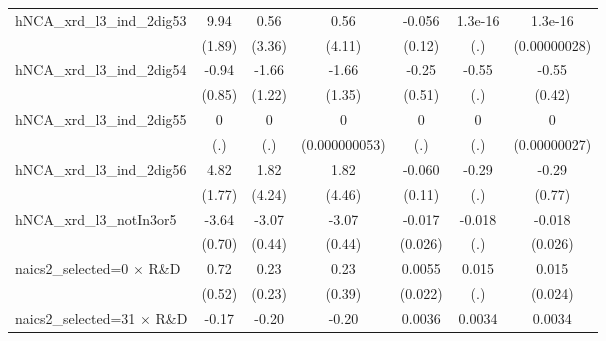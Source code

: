 {\begin{tabular}{l*{6}{c}}
hNCA\_xrd\_l3\_ind\_2dig53&        9.94\sym{***}&        0.56         &        0.56         &      -0.056         &     1.3e-16         &     1.3e-16         \\
                    &      (1.89)         &      (3.36)         &      (4.11)         &      (0.12)         &         (.)         &(0.00000028)         \\
\addlinespace
hNCA\_xrd\_l3\_ind\_2dig54&       -0.94         &       -1.66         &       -1.66         &       -0.25         &       -0.55         &       -0.55         \\
                    &      (0.85)         &      (1.22)         &      (1.35)         &      (0.51)         &         (.)         &      (0.42)         \\
\addlinespace
hNCA\_xrd\_l3\_ind\_2dig55&           0         &           0         &           0         &           0         &           0         &           0         \\
                    &         (.)         &         (.)         &(0.000000053)         &         (.)         &         (.)         &(0.00000027)         \\
\addlinespace
hNCA\_xrd\_l3\_ind\_2dig56&        4.82\sym{***}&        1.82         &        1.82         &      -0.060         &       -0.29         &       -0.29         \\
                    &      (1.77)         &      (4.24)         &      (4.46)         &      (0.11)         &         (.)         &      (0.77)         \\
\addlinespace
hNCA\_xrd\_l3\_notIn3or5&       -3.64\sym{***}&       -3.07\sym{***}&       -3.07\sym{***}&      -0.017         &      -0.018         &      -0.018         \\
                    &      (0.70)         &      (0.44)         &      (0.44)         &     (0.026)         &         (.)         &     (0.026)         \\
\addlinespace
naics2\_selected=0 $\times$ R\&D&        0.72         &        0.23         &        0.23         &      0.0055         &       0.015         &       0.015         \\
                    &      (0.52)         &      (0.23)         &      (0.39)         &     (0.022)         &         (.)         &     (0.024)         \\
\addlinespace
naics2\_selected=31 $\times$ R\&D&       -0.17         &       -0.20         &       -0.20         &      0.0036         &      0.0034         &      0.0034         \\

\end{tabular}}
